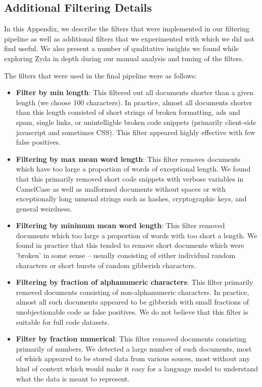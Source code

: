 \documentclass{article}
\begin{document}
\subsection{Additional Filtering Details}
\label{Filtering_details}
In this Appendix, we describe the filters that were implemented in our filtering pipeline as well as additional filters that we experimented with which we did not find useful. We also present a number of qualitative insights we found while exploring Zyda in depth during our manual analysis and tuning of the filters.

The filters that were used in the final pipeline were as follows:
\begin{itemize}
    \item \textbf{Filter by min length}: This filtered out all documents shorter than a given length (we choose 100 characters). In practice, almost all documents shorter than this length consisted of short strings of broken formatting, ads and spam, single links, or unintelligble broken code snippets (primarily client-side javascript and sometimes CSS). This filter appeared highly effective with few false positives.
    \item \textbf{Filtering by max mean word length}: This filter removes documents which have too large a proportion of words of exceptional length. We found that this primarily removed short code snippets with verbose variables in CamelCase as well as malformed documents without spaces or with exceptionally long unusual strings such as hashes, cryptographic keys, and general weirdness.
    \item \textbf{Filtering by minimum mean word length}: This filter removed documents which too large a proportion of words with too short a length. We found in practice that this tended to remove short documents which were 'broken' in some sense -- usually consisting of either individual random characters or short bursts of random gibberish characters.
    \item \textbf{Filtering by fraction of alphanumeric characters}: This filter primarily removed documents consisting of non-alphanumeric characters. In practice, almost all such documents appeared to be gibberish with small fractions of unobjectionable code as false positives. We do not believe that this filter is suitable for full code datasets.
    \item \textbf{Filter by fraction numerical}: This filter removed documents consisting primarily of numbers. We detected a large number of such documents, most of which appeared to be stored data from various souces, most without any kind of context which would make it easy for a language model to understand what the data is meant to represent.

\end{itemize}
\end{document}

